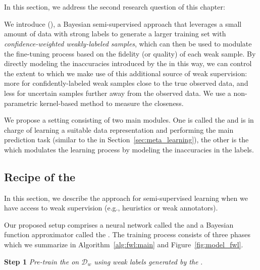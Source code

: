 \newcommand{\tfunc}{T} %
\section{\fwlfull}
\label{sec:fidelity_weighted_learning}

In this section, we address the second research question of this chapter:

We introduce \fwlfull (\fwl), a Bayesian semi-supervised approach that leverages a small amount of data with strong labels to generate a larger training set with \emph{confidence-weighted weakly-labeled samples}, which can then be used to modulate the fine-tuning process based on the fidelity (or quality) of each weak sample. By directly modeling the inaccuracies introduced by the \wa in this way, we can control the extent to which we make use of this additional source of weak supervision: more for confidently-labeled weak samples close to the true observed data, and less for uncertain samples further away from the observed data. We use a non-parametric kernel-based method to measure the closeness.

We propose a setting consisting of two main modules. One is called the \std and is in charge of learning a suitable data representation and performing the main prediction task (similar to the \tnet in Section~\ref{sec:meta_learning}), the other is the \tch which modulates the learning process by modeling the inaccuracies in the labels. 


\subsection{Recipe of the \fwlfull}
\label{sec:proposed-method}
In this section, we describe the \fwl approach for semi-supervised learning when we have access to weak supervision (e.g., heuristics or weak annotators). 

Our proposed setup comprises a neural network called the \textbf{\std} and a Bayesian function approximator called the \textbf{\tch}. The training process consists of three phases which we summarize in Algorithm~\ref{alg:fwl:main} and Figure~\ref{fig:model_fwl}.

\textbf{Step 1} \emph{Pre-train the \std on $\mathcal{D}_w$ using weak labels generated by the \wa}. 


